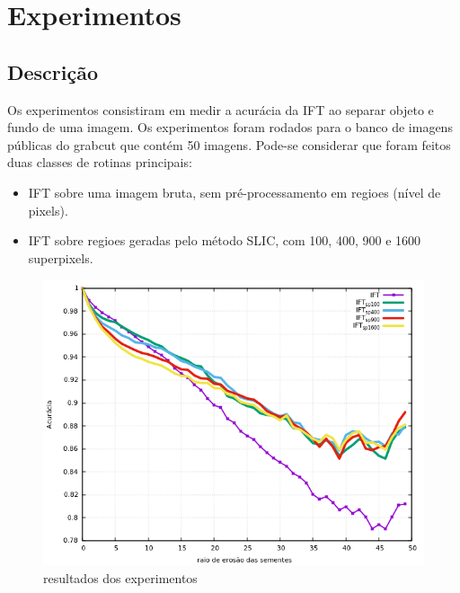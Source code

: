 \chapter{Experimentos}
\label{cap:cap-experimentos}


\section{Descrição}


Os experimentos consistiram em medir a acurácia da IFT ao separar objeto e fundo de uma imagem. Os experimentos foram rodados para o banco de imagens públicas do grabcut que contém 50 imagens. 
Pode-se considerar que foram feitos duas classes de rotinas principais:

\begin{itemize}
\item IFT sobre uma imagem bruta, sem pré-processamento em regioes (nível de pixels).
\item IFT sobre regioes geradas pelo método SLIC, com 100, 400, 900 e 1600 superpixels.
\end{itemize}



\begin{figure}[!h]
\begin{center}
\includegraphics[width=14cm]{figuras/resultados}
\caption{\label{fig:resultados} resultados dos experimentos}
\end{center}
\end{figure}
